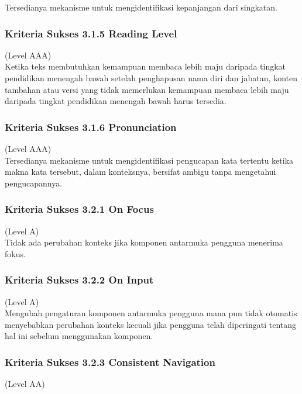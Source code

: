 Tersedianya mekanisme untuk mengidentifikasi kepanjangan dari singkatan.

\subsubsection{Kriteria Sukses 3.1.5 Reading Level}
\label{subsubsec:kriteria_3.1.5}
(Level AAA) \\

Ketika teks membutuhkan kemampuan membaca lebih maju daripada tingkat pendidikan menengah bawah setelah penghapusan nama diri dan jabatan, konten tambahan atau versi yang tidak memerlukan kemampuan membaca lebih maju daripada tingkat pendidikan menengah bawah harus tersedia.

\subsubsection{Kriteria Sukses 3.1.6 Pronunciation}
\label{subsubsec:kriteria_3.1.6}
(Level AAA) \\

Tersedianya mekanisme untuk mengidentifikasi pengucapan kata tertentu ketika makna kata tersebut, dalam konteksnya, bersifat ambigu tanpa mengetahui pengucapannya.

\subsubsection{Kriteria Sukses 3.2.1 On Focus}
\label{subsubsec:kriteria_3.2.1}
(Level A) \\

Tidak ada perubahan konteks jika komponen antarmuka pengguna menerima fokus.

\subsubsection{Kriteria Sukses 3.2.2 On Input}
\label{subsubsec:kriteria_3.2.2}
(Level A) \\

Mengubah pengaturan komponen antarmuka pengguna mana pun tidak otomatis menyebabkan perubahan konteks kecuali jika pengguna telah diperingati tentang hal ini sebelum menggunakan komponen.

\subsubsection{Kriteria Sukses 3.2.3 Consistent Navigation}
\label{subsubsec:kriteria_3.2.3}
(Level AA) \\

